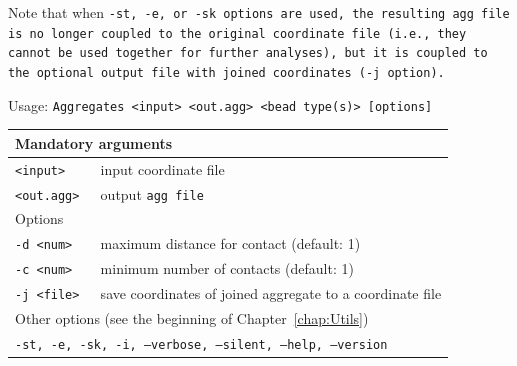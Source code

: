 Note that when \tt{-st}, \tt{-e}, or \tt{-sk} options are used, the resulting
\tt{agg} file is no longer coupled to the original coordinate file (i.e., they
cannot be used together for further analyses), but it is coupled to the optional
output file with joined coordinates (\tt{-j} option).

\vspace{1em}
\noindent
Usage: \tt{Aggregates <input> <out.agg> <bead type(s)> [options]}
\noindent
\begin{longtable}{p{}p{}}
  \toprule
  \multicolumn{2}{l}{Mandatory arguments}\\
  \midrule
  \tt{<input>}        & input coordinate file\\
  \tt{<out.agg>}      & output \tt{agg} file\\
  \midrule
  \multicolumn{2}{l}{Options}\\
  \midrule
  \tt{-d <num>}       & maximum distance for contact (default: 1)\\
  \tt{-c <num>}       & minimum number of contacts (default: 1)\\
  \tt{-j <file>}      & save coordinates of joined aggregate to
                        a coordinate file\\
  \midrule
  \multicolumn{2}{l}{Other options (see the beginning of 
                     Chapter~\ref{chap:Utils})}\\
  \midrule
  \multicolumn{2}{l}{\tt{-st},
                     \tt{-e},
                     \tt{-sk},
                     \tt{-i},
                     \tt{--verbose},
                     \tt{--silent},
                     \tt{--help},
                     \tt{--version}}\\
  \bottomrule
\end{longtable}
